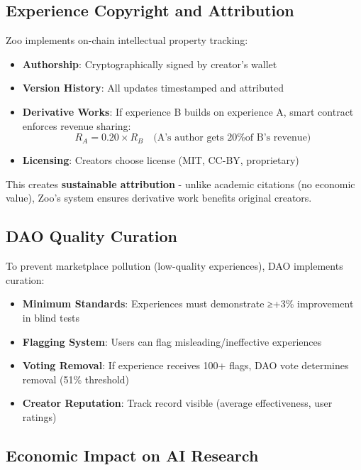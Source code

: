 \documentclass[11pt,letterpaper]{article}
\theoremstyle{definition}
\theoremstyle{remark}
\begin{document}
\subsection{Experience Copyright and Attribution}

Zoo implements on-chain intellectual property tracking:

\begin{itemize}
\item \textbf{Authorship}: Cryptographically signed by creator's wallet
\item \textbf{Version History}: All updates timestamped and attributed
\item \textbf{Derivative Works}: If experience B builds on experience A, smart contract enforces revenue sharing:
    \begin{equation}
    R_A = 0.20 \times R_B \quad \text{(A's author gets 20\% of B's revenue)}
    \end{equation}
\item \textbf{Licensing}: Creators choose license (MIT, CC-BY, proprietary)
\end{itemize}

This creates \textbf{sustainable attribution} - unlike academic citations (no economic value), Zoo's system ensures derivative work benefits original creators.

\subsection{DAO Quality Curation}

To prevent marketplace pollution (low-quality experiences), DAO implements curation:

\begin{itemize}
\item \textbf{Minimum Standards}: Experiences must demonstrate ≥+3\% improvement in blind tests
\item \textbf{Flagging System}: Users can flag misleading/ineffective experiences
\item \textbf{Voting Removal}: If experience receives 100+ flags, DAO vote determines removal (51\% threshold)
\item \textbf{Creator Reputation}: Track record visible (average effectiveness, user ratings)
\end{itemize}

\subsection{Economic Impact on AI Research}
\end{document}
